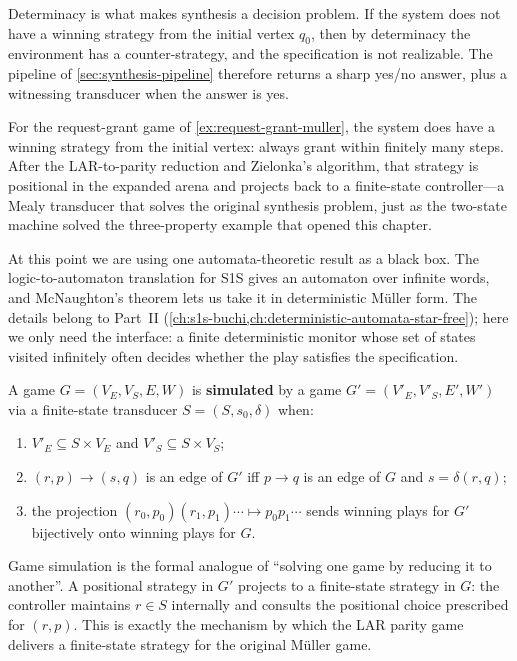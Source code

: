 Determinacy is what makes synthesis a decision problem.  If the system
does not have a winning strategy from the initial vertex $q_0$, then by
determinacy the environment has a counter-strategy, and the
specification is not realizable.  The pipeline of
\cref{sec:synthesis-pipeline} therefore returns a sharp yes/no answer,
plus a witnessing transducer when the answer is yes.

For the request-grant game of \cref{ex:request-grant-muller}, the system
does have a winning strategy from the initial vertex: always grant
within finitely many steps.  After the LAR-to-parity reduction and
Zielonka's algorithm, that strategy is positional in the expanded arena
and projects back to a finite-state controller---a Mealy transducer
that solves the original synthesis problem, just as the two-state
machine solved the three-property example that opened this chapter.

At this point we are using one automata-theoretic result as a black box.
The logic-to-automaton translation for S1S gives an automaton over
infinite words, and McNaughton's theorem lets us take it in deterministic
M\"uller form.  The details belong to Part~II
(\cref{ch:s1s-buchi,ch:deterministic-automata-star-free}); here we only
need the interface: a finite deterministic monitor whose set of states
visited infinitely often decides whether the play satisfies the
specification.

\begin{definition}
\label{def:game-simulation}
A game $G=(V_E,V_S,E,W)$ is \textbf{simulated} by a game
$G'=(V'_E,V'_S,E',W')$ via a finite-state transducer
$S=(S,s_0,\delta)$ when:
\begin{enumerate}[nosep]
  \item $V'_E\subseteq S\times V_E$ and $V'_S\subseteq S\times V_S$;
  \item $(r,p)\to(s,q)$ is an edge of $G'$ iff $p\to q$ is an edge of
        $G$ and $s=\delta(r,q)$;
  \item the projection $(r_0,p_0)(r_1,p_1)\cdots\mapsto p_0p_1\cdots$
        sends winning plays for $G'$ bijectively onto winning plays
        for $G$.
\end{enumerate}
\end{definition}

Game simulation is the formal analogue of ``solving one game by
reducing it to another''.  A positional strategy in $G'$ projects to a
finite-state strategy in $G$: the controller maintains $r\in S$
internally and consults the positional choice prescribed for $(r,p)$.
This is exactly the mechanism by which the LAR parity game delivers a
finite-state strategy for the original M\"uller game.

